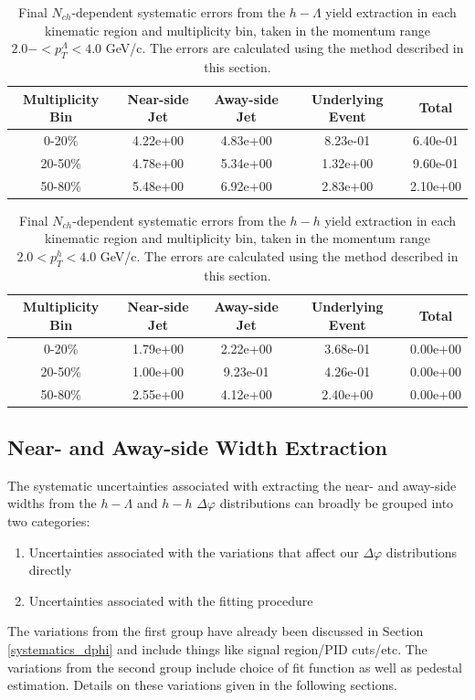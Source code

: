 \documentclass[ALICE,manyauthors]{ALICE_analysis_notes}
\begin{document}
\begin{table}[h!]
\centering
\begin{tabular}{| c || c | c | c | c | }
\hline
Multiplicity Bin & Near-side Jet & Away-side Jet & Underlying Event & Total  \\
\hline
0-20\% & 4.22e+00 & 4.83e+00  & 8.23e-01 & 6.40e-01 \\
20-50\% & 4.78e+00 & 5.34e+00  & 1.32e+00 & 9.60e-01 \\
50-80\% & 5.48e+00 & 6.92e+00  & 2.83e+00 & 2.10e+00 \\
\hline
\end{tabular}
\caption{Final $N_{ch}$-dependent systematic errors from the $h-\Lambda$ yield extraction in each kinematic region and multiplicity bin, taken in the momentum range $2.0- < p_{T}^{\Lambda} < 4.0$ GeV/c. The errors are calculated using the method described in this section.}
\label{h_lambda_yield_extraction_nch_dep_systematics}
\end{table}
\begin{table}[h!]
\centering
\begin{tabular}{| c || c | c | c | c | }
\hline
Multiplicity Bin & Near-side Jet & Away-side Jet & Underlying Event & Total  \\
\hline
0-20\% & 1.79e+00   & 2.22e+00  & 3.68e-01 & 0.00e+00 \\
20-50\% & 1.00e+00 & 9.23e-01  & 4.26e-01 & 0.00e+00 \\
50-80\% & 2.55e+00 & 4.12e+00  & 2.40e+00 & 0.00e+00 \\
\hline
\end{tabular}
\caption{Final $N_{ch}$-dependent systematic errors from the $h-h$ yield extraction in each kinematic region and multiplicity bin, taken in the momentum range $2.0 < p_{T}^{h} < 4.0$ GeV/c. The errors are calculated using the method described in this section.}
\label{h_h_yield_extraction_nch_dep_systematics}
\end{table}

\clearpage

\subsection{Near- and Away-side Width Extraction}
\label{width_extraction_systematics}

The systematic uncertainties associated with extracting the near- and away-side widths from the $h-\Lambda$ and $h-h$ $\Delta\varphi$ distributions can broadly be grouped into two categories:
\begin{enumerate}
\item Uncertainties associated with the variations that affect our $\Delta\varphi$ distributions directly
\item Uncertainties associated with the fitting procedure
\end{enumerate}
The variations from the first group have already been discussed in Section \ref{systematics_dphi} and include things like signal region/PID cuts/etc. The variations from the second group include choice of fit function as well as pedestal estimation. Details on these variations given in the following sections.
\end{document}
